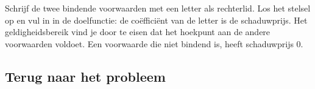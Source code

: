 \begin{werkwijze}
Schrijf de twee bindende voorwaarden met een letter als rechterlid. Los het stelsel op en vul in in de doelfunctie: de coëfficiënt van de letter is de schaduwprijs. Het geldigheidsbereik vind je door te eisen dat het hoekpunt aan de andere voorwaarden voldoet. Een voorwaarde die niet bindend is, heeft schaduwprijs 0.
\end{werkwijze}


\begin{oefeningen}

\end{oefeningen}

\subsection{Terug naar het probleem}

